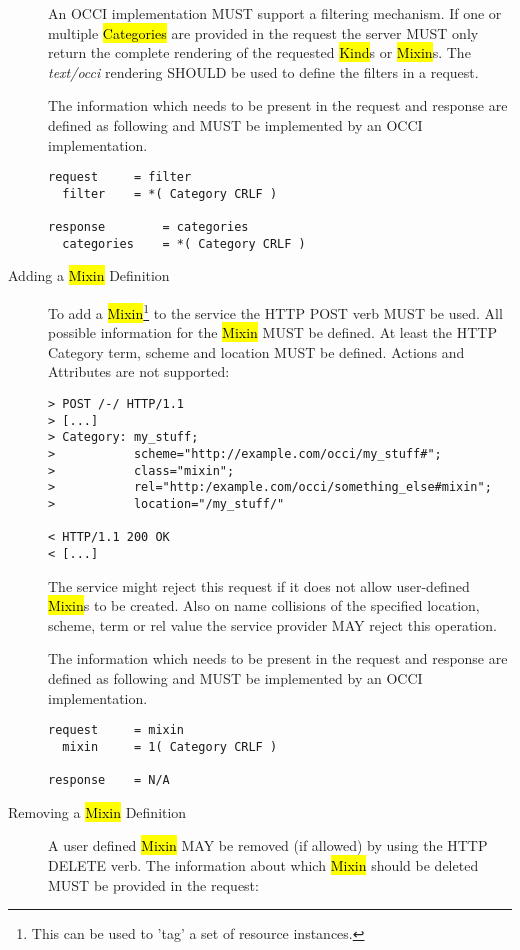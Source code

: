 \documentclass[10pt,a4paper]{article}
\begin{document}
\begin{description}
    An OCCI implementation MUST support a filtering mechanism. If one
    or multiple \hl{Categories} are provided in the request the server
    MUST only return the complete rendering of the requested
    \hl{Kind}s or \hl{Mixin}s. The \emph{text/occi} rendering SHOULD
    be used to define the filters in a request.

    The information which needs to be present in the request and
    response are defined as following and MUST be implemented by an
    OCCI implementation.

\begin{verbatim}
request     = filter
  filter    = *( Category CRLF )

response        = categories
  categories    = *( Category CRLF )
\end{verbatim}

  \item[Adding a \hl{Mixin} Definition] To add a
    \hl{Mixin}\footnote{This can be used to 'tag' a set of resource
      instances.} to the service the HTTP POST verb MUST be used. All
    possible information for the \hl{Mixin} MUST be defined. At least
    the HTTP Category term, scheme and location MUST be
    defined. Actions and Attributes are not supported:

\begin{verbatim}
> POST /-/ HTTP/1.1
> [...]
> Category: my_stuff;
>           scheme="http://example.com/occi/my_stuff#";
>           class="mixin";
>           rel="http:/example.com/occi/something_else#mixin";
>           location="/my_stuff/"

< HTTP/1.1 200 OK
< [...]
\end{verbatim}

    The service might reject this request if it does not allow
    user-defined \hl{Mixin}s to be created. Also on name collisions of
    the specified location, scheme, term or rel value the service
    provider MAY reject this operation.

    The information which needs to be present in the request and
    response are defined as following and MUST be implemented by an
    OCCI implementation.

\begin{verbatim}
request     = mixin
  mixin     = 1( Category CRLF )

response    = N/A
\end{verbatim}

  \item[Removing a \hl{Mixin} Definition] A user defined \hl{Mixin}
    MAY be removed (if allowed) by using the HTTP DELETE verb. The
    information about which \hl{Mixin} should be deleted MUST be
    provided in the request:
    

\end{description}
\end{document}
